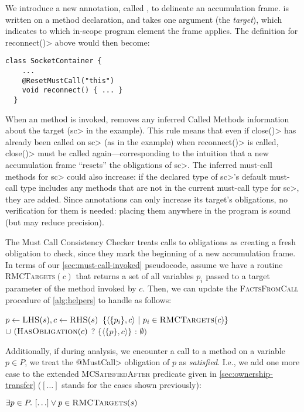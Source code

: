 We introduce a new annotation, called \ResetMustCall, to delineate
an accumulation frame. \ResetMustCall is written on a method
declaration, and takes one argument (the \emph{target}), which
indicates to which in-scope program element the frame applies. The
definition for \<reconnect()> above would then become:

\begin{lstlisting}[frame=tb,belowskip=3mm]
  class SocketContainer {
    ...
    @ResetMustCall("this")
    void reconnect() { ... }
  }
\end{lstlisting}
When an \ResetMustCall
method is invoked, \Tool removes any
inferred Called Methods information about the target (\<sc> in the example).
This rule means that even if \<close()> has already been called on \<sc>
(as in the example)
when \<reconnect()>
is called, \<close()> must be called again---corresponding to the intuition
that a new accumulation frame ``resets'' the obligations of \<sc>.
The inferred must-call methods for \<sc> could also increase:
if the declared type of \<sc>'s default must-call type includes any
methods that are not in the current must-call type for \<sc>, they are added.
Since \ResetMustCall annotations can only increase its target's obligations,
no verification for them is needed: placing them anywhere in the program is sound
(but may reduce precision).

The Must Call Consistency Checker treats calls to \ResetMustCall obligations
as creating a fresh obligation to check, since they mark the beginning of a new
accumulation frame.  In terms of our \cref{sec:must-call-invoked} pseudocode,
assume we have a routine \textsc{RMCTargets}$(c)$ that returns a set of all
variables $p_i$ passed to a \ResetMustCall target parameter of the method
invoked by $c$.  Then, we can update the \textsc{FactsFromCall} procedure of
\cref{alg:helpers} to handle \ResetMustCall as follows:
\begin{algorithmic}
  \State $p \gets \textsc{LHS}(s), c \gets \textsc{RHS}(s)$
  \State \Return $\{ \langle \{ p_i \}, c \rangle\ |\ p_i \in \textsc{RMCTargets}(c) \}$ \newline
  \hspace*{5em} $\cup\ (\textsc{HasObligation}(c)$ ? $\{ \langle \{ p \}, c \rangle \}$ : $\emptyset)$
  \EndProcedure
  \end{algorithmic}
Additionally, if during analysis, we encounter a call to a \ResetMustCall
method on a variable $p \in P$, we treat the \<@MustCall>
obligation of $p$ as \emph{satisfied}.  I.e., we add one more
case to the extended \textsc{MCSatisfiedAfter} predicate given in
\cref{sec:ownership-transfer} ($[\ldots]$ stands for the cases shown previously):
\begin{algorithmic}
  \State \Return $\exists p \in P .\ [\ldots] \vee p \in \textsc{RMCTargets}(s)$
  \EndProcedure
\end{algorithmic}

